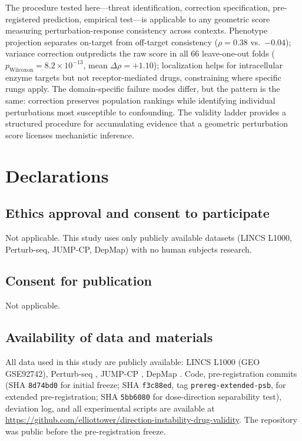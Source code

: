 \documentclass[11pt]{article}
\begin{document}
The procedure tested here---threat identification, correction
specification, pre-registered prediction, empirical test---is applicable
to any geometric score measuring perturbation-response consistency across
contexts. Phenotype projection separates on-target from off-target
consistency ($\rho = 0.38$ vs.\ $-0.04$); variance correction
outpredicts the raw score in all 66 leave-one-out folds
($p_{\text{Wilcoxon}} = 8.2 \times 10^{-13}$, mean
$\Delta\rho = +1.10$); localization helps for intracellular enzyme
targets but not receptor-mediated drugs, constraining where specific
rungs apply. The domain-specific failure modes differ, but the pattern
is the same: correction preserves population rankings while identifying
individual perturbations most susceptible to confounding. The validity
ladder provides a structured procedure for accumulating evidence that
a geometric perturbation score licenses mechanistic inference.

\section*{Declarations}

\subsection*{Ethics approval and consent to participate}
Not applicable. This study uses only publicly available datasets
(LINCS L1000, Perturb-seq, JUMP-CP, DepMap) with no human subjects
research.

\subsection*{Consent for publication}
Not applicable.

\subsection*{Availability of data and materials}
All data used in this study are publicly available: LINCS L1000
(GEO GSE92742), Perturb-seq \citep{replogle2022mapping}, JUMP-CP
\citep{chandrasekaran2023jump}, DepMap \citep{dempster2021chronos}.
Code, pre-registration commits (SHA \texttt{8d74bd0} for initial
freeze; SHA \texttt{f3c88ed}, tag \texttt{prereg-extended-psb}, for
extended pre-registration; SHA \texttt{5bb6080} for dose-direction
separability test), deviation log, and all experimental scripts are
available at
\url{https://github.com/elliottower/direction-instability-drug-validity}.
The repository was public before the pre-registration freeze.
\end{document}
